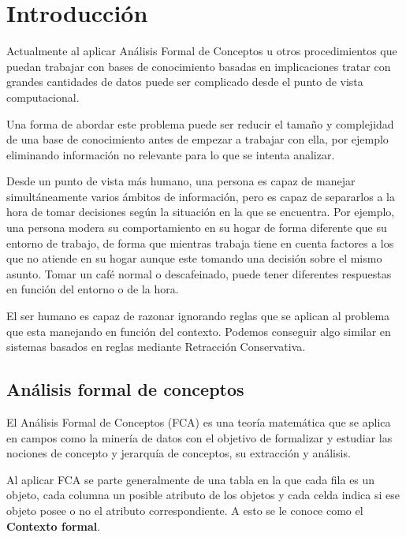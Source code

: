 
\chapter*{Introducción}


	Actualmente al aplicar Análisis Formal de Conceptos u otros procedimientos que puedan 
	trabajar con bases de conocimiento basadas en implicaciones tratar con grandes cantidades 
	de datos puede ser complicado desde el punto de vista computacional.
	
	Una forma de abordar este problema puede ser reducir el tamaño y complejidad de una base 
	de conocimiento antes de empezar a trabajar con ella, por ejemplo eliminando información no 
	relevante para lo que se intenta analizar.   
	
	Desde un punto de vista más humano, una persona es capaz de manejar simultáneamente varios
	ámbitos de información, pero es capaz de separarlos a la hora de tomar decisiones según la 
	situación en la que se encuentra. Por ejemplo, una persona modera su comportamiento en su hogar
	de forma diferente que su entorno de trabajo, de forma que mientras trabaja tiene en cuenta factores
	a los que no atiende en su hogar aunque este tomando una decisión sobre el mismo asunto. Tomar un café 
	normal o descafeinado, puede tener diferentes respuestas en función del entorno o de la hora.
	
	El ser humano es capaz de razonar ignorando reglas que se aplican al problema que esta manejando en función del contexto. Podemos conseguir
	algo similar en sistemas basados en reglas mediante Retracción Conservativa.


\section*{Análisis formal de conceptos}

	El Análisis Formal de Conceptos (FCA) es una teoría matemática que se aplica en campos como la minería de datos con el objetivo de formalizar y estudiar las nociones de concepto y jerarquía de conceptos, su extracción y análisis.
	
	Al aplicar FCA se parte generalmente de una tabla en la que cada fila es un objeto, cada columna un posible atributo de los objetos y cada celda indica si ese objeto posee o no el atributo correspondiente. A esto se le conoce como el \textbf{Contexto formal}.
	
